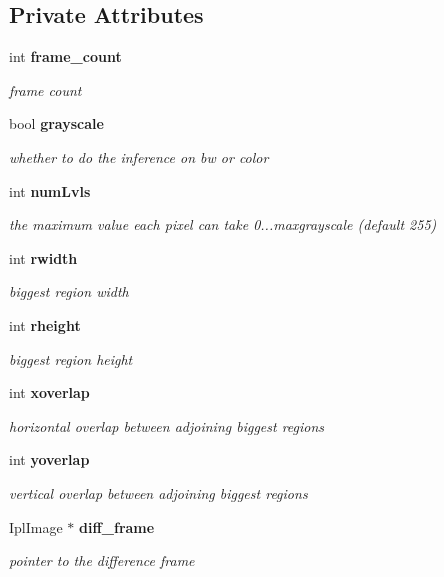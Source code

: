 \subsection*{Private Attributes}
\begin{CompactItemize}
\item 
int {\bf frame\_\-count}
\begin{CompactList}\small\item\em frame count \item\end{CompactList}\item 
bool {\bf grayscale}
\begin{CompactList}\small\item\em whether to do the inference on bw or color \item\end{CompactList}\item 
int {\bf numLvls}
\begin{CompactList}\small\item\em the maximum value each pixel can take 0...maxgrayscale (default 255) \item\end{CompactList}\item 
int {\bf rwidth}
\begin{CompactList}\small\item\em biggest region width \item\end{CompactList}\item 
int {\bf rheight}
\begin{CompactList}\small\item\em biggest region height \item\end{CompactList}\item 
int {\bf xoverlap}
\begin{CompactList}\small\item\em horizontal overlap between adjoining biggest regions \item\end{CompactList}\item 
int {\bf yoverlap}
\begin{CompactList}\small\item\em vertical overlap between adjoining biggest regions \item\end{CompactList}\item 
IplImage $\ast$ {\bf diff\_\-frame}
\begin{CompactList}\small\item\em pointer to the difference frame \item\end{CompactList}\item 

\end{CompactItemize}
